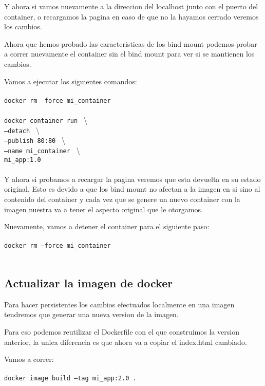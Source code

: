 \documentclass[11pt]{article} %
\begin{document}
Y ahora si vamos nuevamente a la direccion del localhost junto con el puerto del container, o recargamos la pagina en caso de que no la hayamos cerrado veremos los cambios.

Ahora que hemos probado las caracteristicas de los bind mount podemos probar a correr nuevamente el container sin el bind mount para ver si se mantienen los cambios.

Vamos a ejecutar los siguientes comandos: \\ \\
	\texttt{docker rm --force mi\_container} \\ \\
	\texttt{docker container run } \textbackslash \\
	\texttt{--detach } \textbackslash \\
	\texttt{--publish 80:80 } \textbackslash \\
	\texttt{--name mi\_container } \textbackslash \\
	\texttt{mi\_app:1.0} \\ \\

Y ahora si probamos a recargar la pagina veremos que esta devuelta en su estado original. Esto es devido a que los bind mount no afectan a la imagen en si sino al contenido del container y cada vez que se genere un nuevo container con la imagen nuestra va a tener el aspecto original que le otorgamos.

Nuevamente, vamos a detener el container para el siguiente paso: \\ \\
	\texttt{docker rm --force mi\_container} \\ \\

\subsection{Actualizar la imagen de docker}

Para hacer persistentes los cambios efectuados localmente en una imagen tendremos que generar una nueva version de la imagen.

Para eso podemos reutilizar el Dockerfile con el que construimos la version anterior, la unica diferencia es que ahora va a copiar el index.html cambiado.

Vamos a correr: \\ \\
	\texttt{docker image build --tag mi\_app:2.0 .} \\ \\
\end{document}
